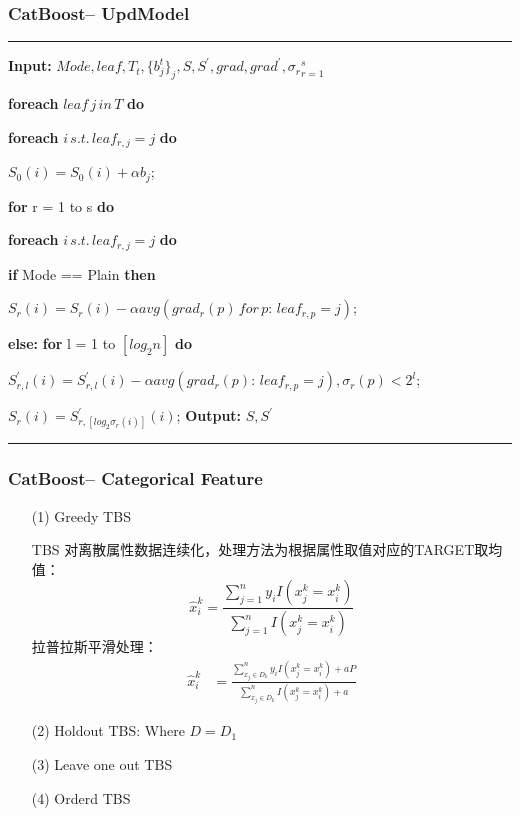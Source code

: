 \documentclass[usenames,dvipsnames]{beamer}
\begin{document}
\begin{frame}
\frametitle{CatBoost-- UpdModel}
\noindent\rule[0.10\baselineskip]{\textwidth}{0.75pt}
\textbf{Input:} $Mode, leaf, T_t, \{b_j^t\}_j, S, S^{'},grad, grad^{'}, {\sigma_r}_{r=1}^{s}$\par
    \hspace*{12pt} \textbf{foreach} $leaf\,j\,in\,T$ \textbf{do}\par
    \hspace*{28pt} \textbf{foreach} $i\,s.t.\,leaf_{r,j}=j$ \textbf{do}\par
    \hspace*{44pt} $S_0(i) = S_0(i) + \alpha b_j$;\par
    \hspace*{28pt} \textbf{for} r = 1 to s \textbf{do}\par
    \hspace*{44pt} \textbf{foreach} $i\,s.t.\,leaf_{r,j}=j$ \textbf{do}\par
    \hspace*{60pt} \textbf{if} Mode == Plain \textbf{then}\par
    \hspace*{76pt} $S_r(i) = S_r(i) - \alpha avg(grad_r(p)\, for\, p:\, leaf_{r,p} = j)$;\par
    \hspace*{60pt} \textbf{else:} \textbf{for} l = 1 to $[log_2n]$ \textbf{do}\par
    \hspace*{92pt} $S_{r,l}^{'}(i) = S_{r,l}^{'}(i) - \alpha avg(grad_r(p):\, leaf_{r,p} = j), \sigma_r(p)<2^l$;\par
    \hspace*{76pt} $S_r(i) = S_{r, [log_2\sigma_r(i)]}^{'}(i)$;
\textbf{Output:} $S, S^{'}$\\
\noindent\rule[0.10\baselineskip]{\textwidth}{0.75pt}
\end{frame}
\begin{frame}
\frametitle{CatBoost-- Categorical Feature}
\begin{itemize}
  \item[(1)] Greedy TBS\par
  TBS 对离散属性数据连续化，处理方法为根据属性取值对应的TARGET取均值：
  $$\hat{x}_i^k = \frac{\sum_{j=1}^n y_iI(x_j^k=x_i^k)}{\sum_{j=1}^n I(x_j^k=x_i^k)}$$
  拉普拉斯平滑处理：
  \begin{align*}
    \hat{x}_i^k & = \frac{\sum_{x_j \in D_k}^n y_iI(x_j^k=x_i^k)+aP}{\sum_{x_j \in D_k}^n I(x_j^k=x_i^k)+a}
  \end{align*}
  \item[(2)] Holdout TBS: Where $D = D_1$
  \item[(3)] Leave one out TBS\par
  \item[(4)] Orderd TBS\par
\end{itemize}
\end{frame}
\end{document}
